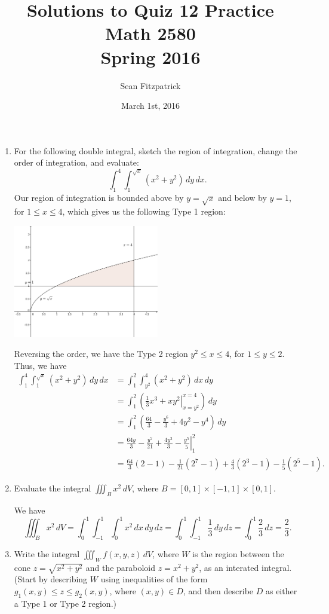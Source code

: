 \documentclass[letterpaper,12pt]{article}
\title{Solutions to Quiz 12 Practice\\Math 2580\\Spring 2016}
\author{Sean Fitzpatrick}
\date{March 1st, 2016}
\newcommand{\di}{\displaystyle}
\begin{document}
 \maketitle

\begin{enumerate}
 \item For the following double integral, sketch the region of integration, change the order of integration, and evaluate:
\[
 \int_1^4\int_1^{\sqrt{x}}(x^2+y^2)\,dy\,dx.
\]
Our region of integration is bounded above by $y=\sqrt{x}$ and below by $y=1$, for $1\leq x\leq 4$, which gives us the following Type 1 region:
\begin{center}
 \includegraphics[width=0.5\textwidth]{Q12-1.png}
\end{center}
Reversing the order, we have the Type 2 region $y^2\leq x\leq 4$, for $1\leq y\leq 2$. Thus, we have
\begin{align*}
 \int_1^4\int_1^{\sqrt{x}} (x^2+y^2)\,dy\,dx & = \int_1^2\int_{y^2}^4(x^2+y^2)\,dx\,dy\\
& = \int_1^2\left(\left. \frac{1}{3}x^3+xy^2\right|_{x=y^2}^{x=4}\right)\,dy\\
& = \int_1^2\left(\frac{64}{3}-\frac{y^6}{3}+4y^2-y^4\right)\,dy\\
& = \left. \frac{64y}{3}-\frac{y^7}{21}+\frac{4y^3}{3}-\frac{y^5}{5}\right|_1^2\\
& = \frac{64}{3}(2-1)-\frac{1}{21}(2^7-1)+\frac{4}{3}(2^3-1)-\frac{1}{5}(2^5-1).
\end{align*}


 \item Evaluate the integral $\di \iiint_B x^2\,dV$, where $B=[0,1]\times [-1,1]\times [0,1]$.

\bigskip

We have
\[
 \iiint_B x^2\,dV = \int_0^1\int_{-1}^1\int_0^1 x^2\,dx\,dy\,dz = \int_0^1\int_{-1}^1 \frac{1}{3}\,dy\,dz = \int_0^1 \frac{2}{3}\,dz = \frac{2}{3}.
\]

 \item Write the integral $\di \iiint_W f(x,y,z)\,dV$, where $W$ is the region between the cone $z=\sqrt{x^2+y^2}$ and the paraboloid $z=x^2+y^2$, as an interated integral. (Start by describing $W$ using inequalities of the form $g_1(x,y)\leq z\leq g_2(x,y)$, where $(x,y)\in D$, and then describe $D$ as either a Type 1 or Type 2 region.)


\end{enumerate}
\end{document}
